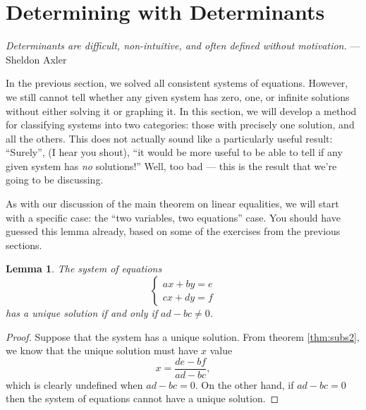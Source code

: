 \documentclass[a4paper,leqno]{article}
\numberwithin{equation}{section}
\newtheorem{lem}[equation]{Lemma}
\theoremstyle{definition}
\theoremstyle{remark}
\begin{document}
\section{Determining with Determinants}
\begin{center}
  \emph{Determinants are difficult, non-intuitive, and often defined without motivation.} --- Sheldon Axler
\end{center}
In the previous section, we solved all consistent systems of equations. However, we still cannot tell whether any given system has zero, one, or
infinite solutions without either solving it or graphing it. In this section, we will develop a method for classifying systems into two categories:
those with precisely one solution, and all the others. This does not actually sound like a particularly useful result: ``Surely'', (I hear you shout),
``it would be more useful to be able to tell if any given system has \emph{no} solutions!'' Well, too bad --- this is the result that we're going to
be discussing.

As with our discussion of the main theorem on linear equalities, we will start with a specific case: the ``two variables, two equations'' case. You should
have guessed this lemma already, based on some of the exercises from the previous sections.
\begin{lem}\label{lem:det2}
  The system of equations
  \begin{equation*}
    \begin{cases}
      ax + by = e\\
      cx + dy = f
    \end{cases}
  \end{equation*}
  has a unique solution if and only if $ ad - bc \neq 0 $.
\end{lem}
\begin{proof}
  Suppose that the system has a unique solution. From theorem \ref{thm:subs2}, we know that the unique solution must have $ x $ value
  \begin{displaymath}
    x = \frac{de - bf}{ad - bc},
  \end{displaymath}
  which is clearly undefined when $ ad - bc = 0 $. On the other hand, if $ ad - bc = 0 $ then the system of equations cannot have
  a unique solution.
\end{proof}
\end{document}
